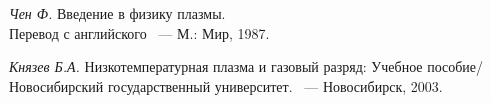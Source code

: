{\begin{lab:literature}
\item \emph{Чен Ф.} Введение в физику плазмы. \\ Перевод с английского ~--- М.: Мир, 1987.

\item \emph{Князев Б.А.} Низкотемпературная плазма и газовый разряд: Учебное пособие/ Новосибирский государственный университет. ~--- Новосибирск, 2003.



\end{lab:literature}

}
